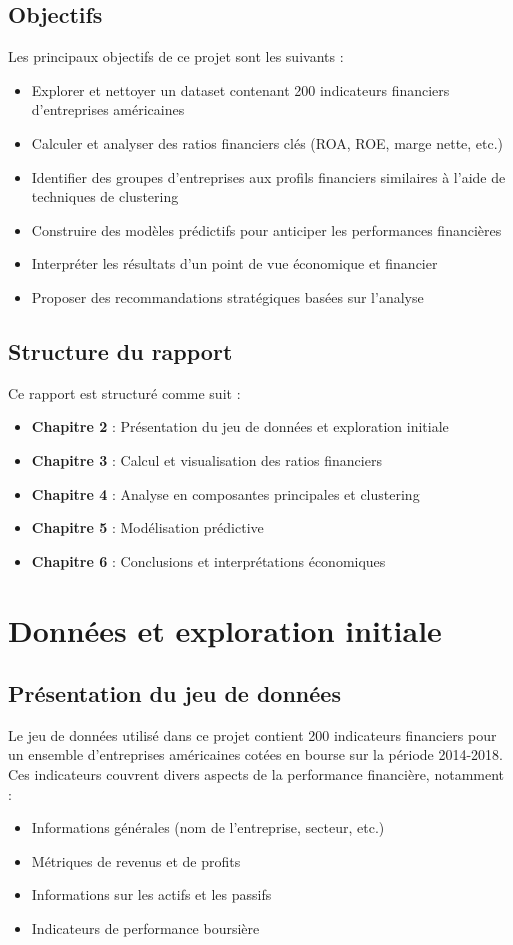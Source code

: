 \documentclass[11pt]{report}
\begin{document}
\section{Objectifs}
Les principaux objectifs de ce projet sont les suivants :
\begin{itemize}
    \item Explorer et nettoyer un dataset contenant 200 indicateurs financiers d'entreprises américaines
    \item Calculer et analyser des ratios financiers clés (ROA, ROE, marge nette, etc.)
    \item Identifier des groupes d'entreprises aux profils financiers similaires à l'aide de techniques de clustering
    \item Construire des modèles prédictifs pour anticiper les performances financières
    \item Interpréter les résultats d'un point de vue économique et financier
    \item Proposer des recommandations stratégiques basées sur l'analyse
\end{itemize}

\section{Structure du rapport}
Ce rapport est structuré comme suit :
\begin{itemize}
    \item \textbf{Chapitre 2} : Présentation du jeu de données et exploration initiale
    \item \textbf{Chapitre 3} : Calcul et visualisation des ratios financiers
    \item \textbf{Chapitre 4} : Analyse en composantes principales et clustering
    \item \textbf{Chapitre 5} : Modélisation prédictive
    \item \textbf{Chapitre 6} : Conclusions et interprétations économiques
\end{itemize}

\chapter{Données et exploration initiale}
\section{Présentation du jeu de données}
Le jeu de données utilisé dans ce projet contient 200 indicateurs financiers pour un ensemble d'entreprises américaines cotées en bourse sur la période 2014-2018. Ces indicateurs couvrent divers aspects de la performance financière, notamment :
\begin{itemize}
    \item Informations générales (nom de l'entreprise, secteur, etc.)
    \item Métriques de revenus et de profits
    \item Informations sur les actifs et les passifs
    \item Indicateurs de performance boursière
\end{itemize}
\end{document}
